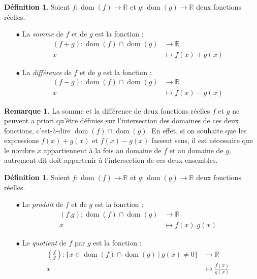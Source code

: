 \documentclass[a4paper,13pt]{scrreprt}
\theoremstyle{plain}
\theoremstyle{definition}
\newtheorem{déf}[subsection]{Définition}
\newtheorem{rema}[subsection]{Remarque}
\newcommand{\rr}{\mathbb{R}}
\DeclareMathOperator{\dom}{dom}
\begin{document}
\begin{déf}
	Soient $f : \dom (f) \to \rr$ et $g : \dom (g) \to \rr$ deux fonctions réelles. \\
	\begin{itemize}
		\item [$\bullet$] La \emph{somme} de $f$ et de $g$ est la fonction : \begin{align*}
		(f+g) : \dom (f) \cap \dom (g) &\to \rr \\
		x &\mapsto f(x) + g(x)
		\end{align*}
		\item [$\bullet$] La \emph{différence} de $f$ et de $g$ est la fonction : \begin{align*}
		(f-g) : \dom (f) \cap \dom (g) &\to \rr \\
		x &\mapsto f(x) - g(x)
		\end{align*}
	\end{itemize}
\end{déf}
\begin{rema}
	La somme et la différence de deux fonctions réelles $f$ et $g$ ne peuvent a priori qu'être définies sur l'intersection des domaines de ces deux fonctions, c'est-à-dire $\dom (f) \cap \dom (g)$. En effet, si on souhaite que les expressions $f(x) + g(x)$ et $f(x) - g(x)$ fassent sens, il est nécessaire que le nombre $x$ appartiennent à la fois au domaine de $f$ et au domaine de $g$, autrement dit doit appartenir à l'intersection de ces deux ensembles.
\end{rema}
\begin{déf}
	Soient $f : \dom (f) \to \rr$ et $g : \dom (g) \to \rr$ deux fonctions réelles. \\
	\begin{itemize}
		\item [$\bullet$] Le \emph{produit} de $f$ et de $g$ est la fonction : \begin{align*}
		(f.g) : \dom (f) \cap \dom (g) &\to \rr \\
		x &\mapsto f(x).g(x)
		\end{align*}
		\item [$\bullet$] Le \emph{quotient} de $f$ par $g$ est la fonction : \begin{align*}
		\left(\frac{f}{g}\right) : \{x \in \dom (f) \cap \dom (g)~|~g(x) \neq 0\} &\to \rr \\
		x &\mapsto \frac{f(x)}{g(x)}
		\end{align*}
	\end{itemize}
\end{déf}
\end{document}
